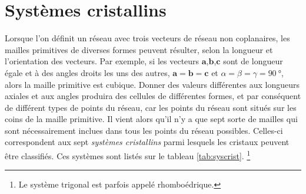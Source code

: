 \section{Systèmes cristallins}

Lorsque l'on définit un réseau avec trois vecteurs de réseau non coplanaires, les
mailles primitives de diverses formes peuvent résulter, selon la longueur et
l'orientation des vecteurs. Par exemple, si les vecteurs
$\mathbf{a}$,$\mathbf{b}$,$\mathbf{c}$ sont de longueur égale et à des angles
droits les uns des autres, \ie $\mathbf{a = b = c}$ et $\alpha = \beta = \gamma
= \SI{90}{\degree}$, alors la maille primitive est cubique. Donner des valeurs
différentes aux longueurs axiales et aux angles produira des cellules de
différentes formes, et par conséquent de différent types de points du réseau, car
les points du réseau sont situés sur les coins de la maille primitive. Il vient
alors qu'il n'y a que sept sorte de mailles qui sont nécessairement inclues dans
tous les points du réseau possibles. Celles-ci correspondent aux sept
\emph{systèmes cristallins} parmi lesquels les cristaux peuvent être classifiés.
Ces systèmes sont listés sur le tableau \ref{tab:syscrist}. \footnote{Le système
trigonal est parfois appelé rhomboédrique.}

